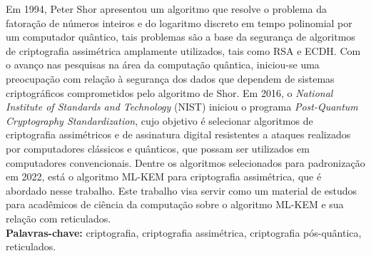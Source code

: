 \noindent
Em 1994, Peter Shor apresentou um algoritmo que resolve o problema da fatoração de números inteiros e do logaritmo discreto em tempo polinomial por um computador quântico, tais problemas são a base da segurança de algoritmos de criptografia assimétrica amplamente utilizados, tais como RSA e ECDH. Com o avanço nas pesquisas na área da computação quântica, iniciou-se uma preocupação com relação à segurança dos dados que dependem de sistemas criptográficos comprometidos pelo algoritmo de Shor. Em 2016, o \textit{National Institute of Standards and Technology} (NIST) iniciou o programa \textit{Post-Quantum Cryptography Standardization}, cujo objetivo é selecionar algoritmos de criptografia assimétricos e de assinatura digital resistentes a ataques realizados por computadores clássicos e quânticos, que possam ser utilizados em computadores convencionais. Dentre os algoritmos selecionados para padronização em 2022, está o algoritmo \ac{ML-KEM} para criptografia assimétrica, que é abordado nesse trabalho. Este trabalho visa servir como um material de estudos para acadêmicos de ciência da computação sobre o algoritmo \ac{ML-KEM} e sua relação com reticulados.\\

\noindent
\textbf{Palavras-chave:} criptografia, criptografia assimétrica, criptografia pós-quântica, reticulados.
